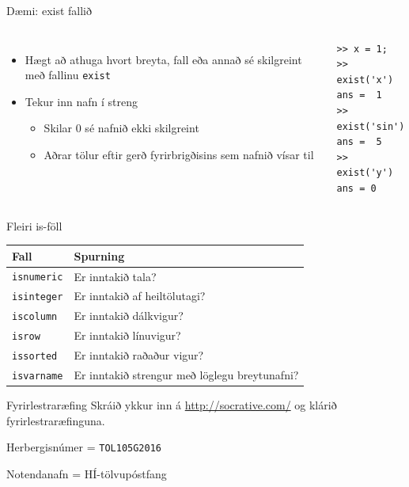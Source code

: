 \documentclass{beamer}
\begin{document}
\begin{frame}[fragile]{Dæmi: exist fallið}
\begin{columns}
\begin{itemize}
 \item Hægt að athuga hvort breyta, fall eða annað sé skilgreint með fallinu \texttt{exist}
 \item Tekur inn nafn í streng
 \begin{itemize}
  \item Skilar 0 sé nafnið ekki skilgreint
  \item Aðrar tölur eftir gerð fyrirbrigðisins sem nafnið vísar til
 \end{itemize}
\end{itemize}
\begin{verbatim}
>> x = 1;
>> exist('x')
ans =  1
>> exist('sin')
ans =  5
>> exist('y')
ans = 0
\end{verbatim}
\end{columns}
\end{frame}

\begin{frame}{Fleiri is-föll}
\begin{center}
\begin{tabular}{ll}
\toprule
Fall&Spurning\\
\midrule
\texttt{isnumeric}&Er inntakið tala?\\
\texttt{isinteger}&Er inntakið af heiltölutagi?\\
\texttt{iscolumn}&Er inntakið dálkvigur?\\
\texttt{isrow}&Er inntakið línuvigur?\\
\texttt{issorted}&Er inntakið raðaður vigur?\\
\texttt{isvarname}&Er inntakið strengur með löglegu breytunafni?\\
\bottomrule
\end{tabular}
\end{center}
\end{frame}

\begin{frame}{Fyrirlestraræfing}
Skráið ykkur inn á \url{http://socrative.com/} og klárið fyrirlestraræfinguna.

Herbergisnúmer = \texttt{TOL105G2016}

Notendanafn = HÍ-tölvupóstfang
\end{frame}
\end{document}
